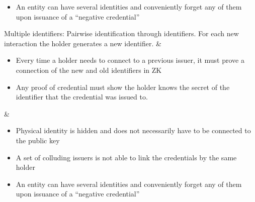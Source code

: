 \begin{table}[H]
\begin{funcprivtabular}{.23}{.29}{.41}
\begin{itemize}
    \item An entity can have several identities and conveniently forget any of them upon issuance of a ``negative credential''
  \end{itemize}
\rowend
\hline
  Multiple identifiers: Pairwise identification through identifiers. For each new interaction the holder generates a new identifier. 
& \begin{itemize}	
    \item Every time a holder needs to connect to a previous issuer, it must prove a connection of the new and old identifiers in ZK
    \item Any proof of credential must show the holder knows the secret of the identifier that the credential was issued to.
  \end{itemize}	 
& \setlinenumbermargin{45em}\CIL
  \begin{itemize}	 
    \item Physical identity is hidden and does not necessarily have to be connected to the public key
    \item A set of colluding issuers is not able to link the credentials by the same holder
    \item An entity can have several identities and conveniently forget any of them upon issuance of a ``negative credential''
  \end{itemize}
\rowend
\hline
\end{funcprivtabular}\nolinenumbers
\end{table}


